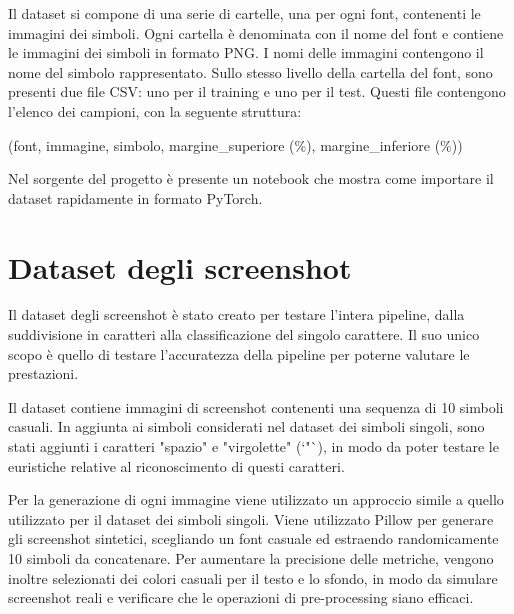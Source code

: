 Il dataset si compone di una serie di cartelle, una per ogni font, contenenti le immagini dei simboli. Ogni cartella è denominata con il nome del font e contiene le immagini dei simboli in formato PNG. I nomi delle immagini contengono il nome del simbolo rappresentato. Sullo stesso livello della cartella del font, sono presenti due file CSV: uno per il training e uno per il test. Questi file contengono l'elenco dei campioni, con la seguente struttura:
\begin{center}
(font, immagine, simbolo, margine\_superiore (\%), margine\_inferiore (\%))
\end{center}

Nel sorgente del progetto è presente un notebook che mostra come importare il dataset rapidamente in formato PyTorch.

\section{Dataset degli screenshot}

Il dataset degli screenshot è stato creato per testare l'intera pipeline, dalla suddivisione in caratteri alla classificazione del singolo carattere. Il suo unico scopo è quello di testare l'accuratezza della pipeline per poterne valutare le prestazioni. 

Il dataset contiene immagini di screenshot contenenti una sequenza di 10 simboli casuali. In aggiunta ai simboli considerati nel dataset dei simboli singoli, sono stati aggiunti i caratteri "spazio" e "virgolette" (`"`), in modo da poter testare le euristiche relative al riconoscimento di questi caratteri.

Per la generazione di ogni immagine viene utilizzato un approccio simile a quello utilizzato per il dataset dei simboli singoli. Viene utilizzato Pillow per generare gli screenshot sintetici, scegliando un font casuale ed estraendo randomicamente 10 simboli da concatenare. Per aumentare la precisione delle metriche, vengono inoltre selezionati dei colori casuali per il testo e lo sfondo, in modo da simulare screenshot reali e verificare che le operazioni di pre-processing siano efficaci.


